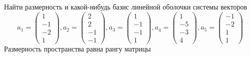 Найти размерность и какой-нибудь базис линейной оболочки системы векторов
$$ a_1 =
\begin{pmatrix}
	1 \\
    -1 \\
    -2 \\
    1
\end{pmatrix}, a_2 =
\begin{pmatrix}
	2 \\
    2 \\
    -1 \\
    -1
\end{pmatrix}, a_3 =
\begin{pmatrix}
	1 \\
    -1 \\
    -1 \\
    1
\end{pmatrix}, a_4 =
\begin{pmatrix}
	1 \\
    -5 \\
    -3 \\
    4
\end{pmatrix}, a_5 =
\begin{pmatrix}
	-1 \\
    -2 \\
    1 \\
    1
\end{pmatrix} $$
Размерность пространства равна рангу матрицы
